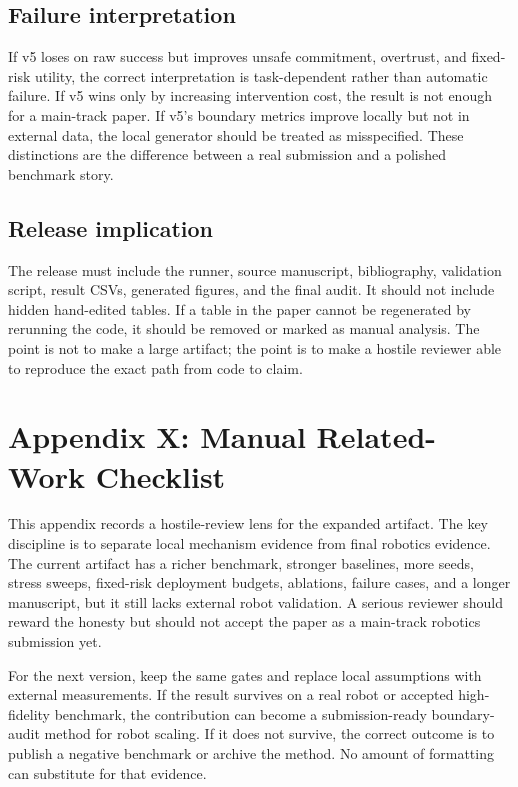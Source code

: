 \documentclass{article}
\begin{document}
\subsection{Failure interpretation}
If v5 loses on raw success but improves unsafe commitment, overtrust, and fixed-risk utility, the correct interpretation is task-dependent rather than automatic failure. If v5 wins only by increasing intervention cost, the result is not enough for a main-track paper. If v5's boundary metrics improve locally but not in external data, the local generator should be treated as misspecified. These distinctions are the difference between a real submission and a polished benchmark story.

\subsection{Release implication}
The release must include the runner, source manuscript, bibliography, validation script, result CSVs, generated figures, and the final audit. It should not include hidden hand-edited tables. If a table in the paper cannot be regenerated by rerunning the code, it should be removed or marked as manual analysis. The point is not to make a large artifact; the point is to make a hostile reviewer able to reproduce the exact path from code to claim.


\section{Appendix X: Manual Related-Work Checklist}
This appendix records a hostile-review lens for the expanded artifact. The key discipline is to separate local mechanism evidence from final robotics evidence. The current artifact has a richer benchmark, stronger baselines, more seeds, stress sweeps, fixed-risk deployment budgets, ablations, failure cases, and a longer manuscript, but it still lacks external robot validation. A serious reviewer should reward the honesty but should not accept the paper as a main-track robotics submission yet.

For the next version, keep the same gates and replace local assumptions with external measurements. If the result survives on a real robot or accepted high-fidelity benchmark, the contribution can become a submission-ready boundary-audit method for robot scaling. If it does not survive, the correct outcome is to publish a negative benchmark or archive the method. No amount of formatting can substitute for that evidence.
\end{document}
